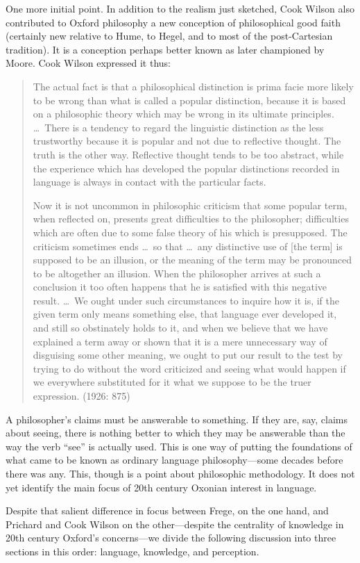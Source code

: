 One more initial point. In addition to the realism just sketched, Cook Wilson also contributed to Oxford philosophy a new conception of philosophical good faith (certainly new relative to Hume, to Hegel, and to most of the post-Cartesian tradition). It is a conception perhaps better known as later championed by Moore. Cook Wilson expressed it thus:
\begin{quotation}
	\noindent The actual fact is that a philosophical distinction is prima facie more likely to be wrong than what is called a popular distinction, because it is based on a philosophic theory which may be wrong in its ultimate principles. \ldots\ There is a tendency to regard the linguistic distinction as the less trustworthy because it is popular and not due to reflective thought. The truth is the other way. Reflective thought tends to be too abstract, while the experience which has developed the popular distinctions recorded in language is always in contact with the particular facts.
	
	Now it is not uncommon in philosophic criticism that some popular term, when reflected on, presents great difficulties to the philosopher; difficulties which are often due to some false theory of his which is presupposed. The criticism sometimes ends \ldots\ so that \ldots\ any distinctive use of [the term] is supposed to be an illusion, or the meaning of the term may be pronounced to be altogether an illusion. When the philosopher arrives at such a conclusion it too often happens that he is satisfied with this negative result. \ldots\ We ought under such circumstances to inquire how it is, if the given term only means something else, that language ever developed it, and still so obstinately holds to it, and when we believe that we have explained a term away or shown that it is a mere unnecessary way of disguising some other meaning, we ought to put our result to the test by trying to do without the word criticized and seeing what would happen if we everywhere substituted for it what we suppose to be the truer expression. (1926: 875)
\end{quotation}
A philosopher's claims must be answerable to something. If they are, say, claims about seeing, there is nothing better to which they may be answerable than the way the verb ``see'' is actually used. This is one way of putting the foundations of what came to be known as ordinary language philosophy---some decades before there was any. This, though is a point about philosophic methodology. It does not yet identify the main focus of 20th century Oxonian interest in language. 

Despite that salient difference in focus between Frege, on the one hand, and Prichard and Cook Wilson on the other---despite the centrality of knowledge in 20th century Oxford’s concerns---we divide the following discussion into three sections in this order: language, knowledge, and perception.

